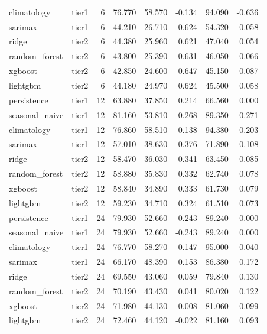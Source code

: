 \begin{table}[htbp]
\begin{tabular}{lrrrrrrr}
climatology & tier1 & 6 & 76.770 & 58.570 & -0.134 & 94.090 & -0.636 \\
sarimax & tier1 & 6 & 44.210 & 26.710 & 0.624 & 54.320 & 0.058 \\
ridge & tier2 & 6 & 44.380 & 25.960 & 0.621 & 47.040 & 0.054 \\
random\_forest & tier2 & 6 & 43.800 & 25.390 & 0.631 & 46.050 & 0.066 \\
xgboost & tier2 & 6 & 42.850 & 24.600 & 0.647 & 45.150 & 0.087 \\
lightgbm & tier2 & 6 & 44.180 & 24.970 & 0.624 & 45.500 & 0.058 \\
persistence & tier1 & 12 & 63.880 & 37.850 & 0.214 & 66.560 & 0.000 \\
seasonal\_naive & tier1 & 12 & 81.160 & 53.810 & -0.268 & 89.350 & -0.271 \\
climatology & tier1 & 12 & 76.860 & 58.510 & -0.138 & 94.380 & -0.203 \\
sarimax & tier1 & 12 & 57.010 & 38.630 & 0.376 & 71.890 & 0.108 \\
ridge & tier2 & 12 & 58.470 & 36.030 & 0.341 & 63.450 & 0.085 \\
random\_forest & tier2 & 12 & 58.880 & 35.830 & 0.332 & 62.740 & 0.078 \\
xgboost & tier2 & 12 & 58.840 & 34.890 & 0.333 & 61.730 & 0.079 \\
lightgbm & tier2 & 12 & 59.230 & 34.710 & 0.324 & 61.510 & 0.073 \\
persistence & tier1 & 24 & 79.930 & 52.660 & -0.243 & 89.240 & 0.000 \\
seasonal\_naive & tier1 & 24 & 79.930 & 52.660 & -0.243 & 89.240 & 0.000 \\
climatology & tier1 & 24 & 76.770 & 58.270 & -0.147 & 95.000 & 0.040 \\
sarimax & tier1 & 24 & 66.170 & 48.390 & 0.153 & 86.380 & 0.172 \\
ridge & tier2 & 24 & 69.550 & 43.060 & 0.059 & 79.840 & 0.130 \\
random\_forest & tier2 & 24 & 70.190 & 43.430 & 0.041 & 80.020 & 0.122 \\
xgboost & tier2 & 24 & 71.980 & 44.130 & -0.008 & 81.060 & 0.099 \\
lightgbm & tier2 & 24 & 72.460 & 44.120 & -0.022 & 81.160 & 0.093 \\
\bottomrule
\end{tabular}
\end{table}
